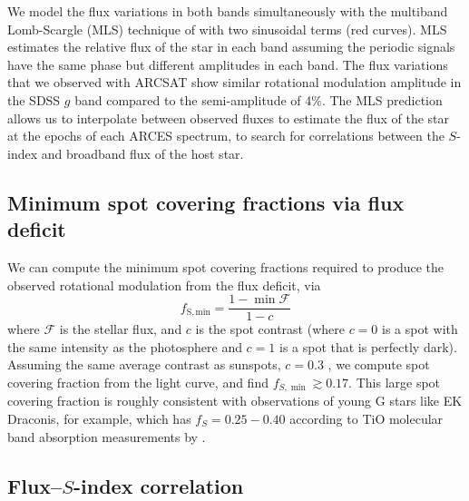 We model the flux variations in both bands simultaneously with the multiband Lomb-Scargle (MLS) technique of  \citet{VanderPlas2015} with two sinusoidal terms (red curves). MLS estimates the relative flux of the star in each band assuming the periodic signals have the same phase but different amplitudes in each band. The flux variations that we observed with ARCSAT show similar rotational modulation amplitude in the SDSS $g$ band compared to the \kepler semi-amplitude of 4\%. The MLS prediction allows us to interpolate between observed fluxes to estimate the flux of the star at the epochs of each ARCES spectrum, to search for correlations between the $S$-index and broadband flux of the host star. 

\subsection{Minimum spot covering fractions via flux deficit}

We can compute the minimum spot covering fractions required to produce the observed rotational modulation from the flux deficit, via
\begin{equation}
f_\mathrm{S, min} = \frac{1 - \min{\mathcal{F}}}{1-c}
\end{equation}
where $\mathcal{F}$ is the stellar flux, and $c$ is the spot contrast (where $c=0$ is a spot with the same intensity as the photosphere and $c=1$ is a spot that is perfectly dark). Assuming the same average contrast as sunspots, $c=0.3$ \citep[see e.g.][]{Morris2017a}, we compute spot covering fraction from the \kepler light curve, and find $f_{S, \min} \gtrsim 0.17$. This large spot covering fraction is roughly consistent with observations of young G stars like EK Draconis, for example, which has $f_S = 0.25-0.40$ according to TiO molecular band absorption measurements by \citet{ONeal2004}.


\subsection{Flux--$S$-index correlation}

